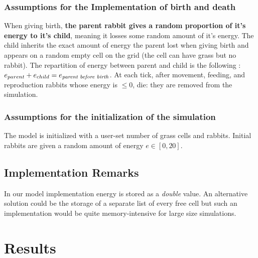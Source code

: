 \documentclass[11pt]{article}
\begin{document}
\subsubsection{Assumptions for the Implementation of birth and death}

When giving birth, \textbf{the parent rabbit gives a random proportion of it's energy to it's child}, meaning it losses some random amount of it's energy. The child inherits the exact amount of energy the parent lost when giving birth and appears on a random empty cell on the grid (the cell can have grass but no rabbit). The repartition of energy between parent and child is the following : $e_{parent} + e_{child} = e_{\text{\textit{parent before birth}}}$. At each tick, after movement, feeding, and reproduction rabbits whose energy is $\leq 0$, die: they are removed from the simulation.

\subsubsection{Assumptions for the initialization of the simulation}

The model is initialized with a user-set number of grass cells and rabbits. Initial rabbits are given a random amount of energy $e \in [0,20]$.

\subsection{Implementation Remarks}


In our model implementation energy is stored as a \textit{double} value. An alternative solution could be the storage of a separate list of every free cell but such an implementation would be quite memory-intensive for large size simulations.

\section{Results}
\end{document}
